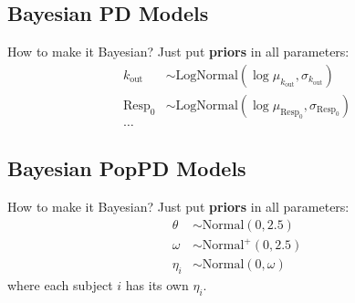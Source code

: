 \subsection{Bayesian PD Models}
\begin{frame}{How to make it Bayesian?}
    Just put \textbf{priors} in all parameters:
    $$
        \begin{aligned}
            k_{\text{out}} & \sim \text{LogNormal}(\log{\mu_{k_{\text{out}}}}, \sigma_{k_{\text{out}}}) \\
            \text{Resp}_0  & \sim \text{LogNormal}(\log{\mu_{\text{Resp}_0}}, \sigma_{\text{Resp}_0})   \\
            \ldots
        \end{aligned}
    $$
\end{frame}

\subsection{Bayesian PopPD Models}
\begin{frame}{How to make it Bayesian?}
    Just put \textbf{priors} in all parameters:
    $$
        \begin{aligned}
            \theta   & \sim \text{Normal}(0, 2.5)  \\
            \omega   & \sim \text{Normal}^+(0, 2.5)  \\
            \eta_{i} & \sim \text{Normal}(0, \omega)
        \end{aligned}
    $$
    \vfill
    where each subject $i$ has its own $\eta_i$.
\end{frame}